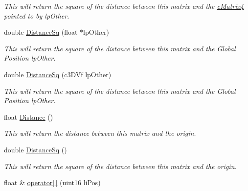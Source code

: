 \begin{DoxyCompactItemize}
\begin{DoxyCompactList}\small\item\em This will return the square of the distance between this matrix and the \hyperlink{classc_matrix4}{cMatrix4} pointed to by lpOther. \end{DoxyCompactList}\item 
\hypertarget{classc_matrix4_ac524fac9525c6ff780e95c648b229e41}{
double \hyperlink{classc_matrix4_ac524fac9525c6ff780e95c648b229e41}{DistanceSq} (float $\ast$lpOther)}
\label{classc_matrix4_ac524fac9525c6ff780e95c648b229e41}

\begin{DoxyCompactList}\small\item\em This will return the square of the distance between this matrix and the Global Position lpOther. \end{DoxyCompactList}\item 
\hypertarget{classc_matrix4_a9fcbadde64114136ecf9cccf75eb2838}{
double \hyperlink{classc_matrix4_a9fcbadde64114136ecf9cccf75eb2838}{DistanceSq} (c3DVf lpOther)}
\label{classc_matrix4_a9fcbadde64114136ecf9cccf75eb2838}

\begin{DoxyCompactList}\small\item\em This will return the square of the distance between this matrix and the Global Position lpOther. \end{DoxyCompactList}\item 
\hypertarget{classc_matrix4_ad6b0005cc0a13b2e186bc213ee842a51}{
float \hyperlink{classc_matrix4_ad6b0005cc0a13b2e186bc213ee842a51}{Distance} ()}
\label{classc_matrix4_ad6b0005cc0a13b2e186bc213ee842a51}

\begin{DoxyCompactList}\small\item\em This will return the distance between this matrix and the origin. \end{DoxyCompactList}\item 
\hypertarget{classc_matrix4_a11fc226f72e4dbd6a5428355def33ee5}{
double \hyperlink{classc_matrix4_a11fc226f72e4dbd6a5428355def33ee5}{DistanceSq} ()}
\label{classc_matrix4_a11fc226f72e4dbd6a5428355def33ee5}

\begin{DoxyCompactList}\small\item\em This will return the square of the distance between this matrix and the origin. \end{DoxyCompactList}\item 
\hypertarget{classc_matrix4_a4b91a4d790f5a0decc76d41e54b80049}{
float \& \hyperlink{classc_matrix4_a4b91a4d790f5a0decc76d41e54b80049}{operator\mbox{[}$\,$\mbox{]}} (uint16 liPos)}
\label{classc_matrix4_a4b91a4d790f5a0decc76d41e54b80049}


\end{DoxyCompactItemize}
